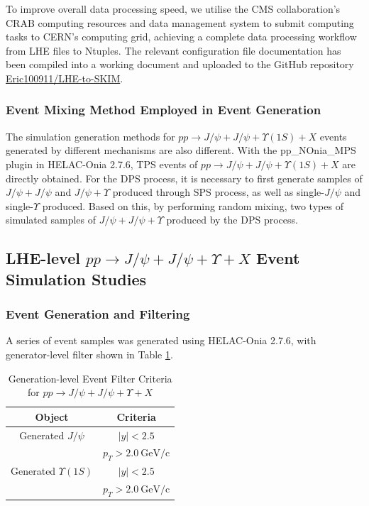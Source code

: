 \documentclass[10pt,twocolumn]{article}
\newcommand*{\GeVc}{~\text{GeV/c}}
\begin{document}
To improve overall data processing speed, we utilise the CMS collaboration's CRAB computing resources and data management system to submit computing tasks to CERN's computing grid, achieving a complete data processing workflow from LHE files to Ntuples. The relevant configuration file documentation has been compiled into a working document and uploaded to the GitHub repository \href{https://github.com/Eric100911/LHE-to-SKIM}{Eric100911/LHE-to-SKIM}.

\subsubsection{Event Mixing Method Employed in Event Generation}

The simulation generation methods for $pp\to J/\psi+J/\psi+\Upsilon(1S)+X$ events generated by different mechanisms are also different. With the pp\_NOnia\_MPS plugin in HELAC-Onia 2.7.6, TPS events of $pp\to J/\psi+J/\psi+\Upsilon(1S)+X$ are directly obtained. For the DPS process, it is necessary to first generate samples of $J/\psi+J/\psi$ and $J/\psi+\Upsilon$ produced through SPS process, as well as single-$J/\psi$ and single-$\Upsilon$ produced. Based on this, by performing random mixing, two types of simulated samples of $J/\psi+J/\psi+\Upsilon$ produced by the DPS process.

\subsection{LHE-level \texorpdfstring{$pp\to J/\psi+J/\psi+\Upsilon+X$}{pp -> J/psi + J/psi + Upsilon + X} Event Simulation Studies}

\subsubsection{Event Generation and Filtering}

A series of event samples was generated using HELAC-Onia 2.7.6, with generator-level filter shown in Table \ref{tab:JpsiJpsiY_MC_GEN_Filter}. 

\begin{table}[h!]
    \centering
    \caption{Generation-level Event Filter Criteria for \texorpdfstring{$pp\to J/\psi+J/\psi+\Upsilon+X$}{pp -> J/psi + J/psi + Upsilon + X}\\}
    \label{tab:JpsiJpsiY_MC_GEN_Filter}
    \begin{tabular}{cc}
        \toprule
        \textbf{Object} & \textbf{Criteria} \\
        \midrule
        Generated $J/\psi $     &   $\left|y\right|<2.5$ \\
                                &   $p_T > 2.0\GeVc$ \\
        Generated $\Upsilon(1S)$&   $\left|y\right|<2.5$ \\
                                &   $p_T > 2.0\GeVc$ \\
        \bottomrule
    \end{tabular}
\end{table}
\end{document}
